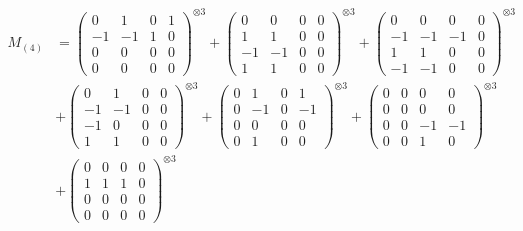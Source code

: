 \documentclass{article}
\newcommand{\Mthree}{%
    M_{(4)}
}
\begin{document}
        \newpage
        
        \footnotesize{
        \begin{align}
        \Mthree
        &= \label{Rs16-Rc11-Solution-29-c1} \begin{pmatrix} 0 & 1 & 0 & 1 \\ -1 & -1 & 1 & 0 \\ 0 & 0 & 0 & 0 \\ 0 & 0 & 0 & 0 \end{pmatrix}^{\otimes 3} 
            + \begin{pmatrix} 0 & 0 & 0 & 0 \\ 1 & 1 & 0 & 0 \\ -1 & -1 & 0 & 0 \\ 1 & 1 & 0 & 0 \end{pmatrix}^{\otimes 3} 
            + \begin{pmatrix} 0 & 0 & 0 & 0 \\ -1 & -1 & -1 & 0 \\ 1 & 1 & 0 & 0 \\ -1 & -1 & 0 & 0 \end{pmatrix}^{\otimes 3} \\
        &+ \label{Rs16-Rc11-Solution-29-c4} \begin{pmatrix} 0 & 1 & 0 & 0 \\ -1 & -1 & 0 & 0 \\ -1 & 0 & 0 & 0 \\ 1 & 1 & 0 & 0 \end{pmatrix}^{\otimes 3} 
            + \begin{pmatrix} 0 & 1 & 0 & 1 \\ 0 & -1 & 0 & -1 \\ 0 & 0 & 0 & 0 \\ 0 & 1 & 0 & 0 \end{pmatrix}^{\otimes 3} 
            + \begin{pmatrix} 0 & 0 & 0 & 0 \\ 0 & 0 & 0 & 0 \\ 0 & 0 & -1 & -1 \\ 0 & 0 & 1 & 0 \end{pmatrix}^{\otimes 3} \\
        &+ \label{Rs16-Rc11-Solution-29-c7} \begin{pmatrix} 0 & 0 & 0 & 0 \\ 1 & 1 & 1 & 0 \\ 0 & 0 & 0 & 0 \\ 0 & 0 & 0 & 0 \end{pmatrix}^{\otimes 3} 

\end{align}}
\end{document}
